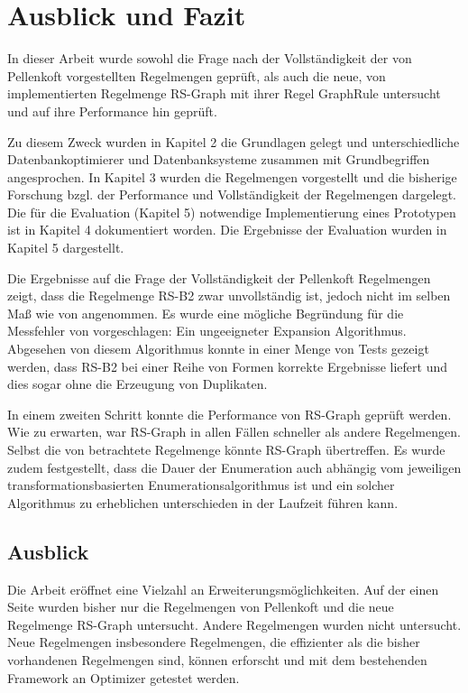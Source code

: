 \chapter{Ausblick und Fazit}


In dieser Arbeit wurde sowohl die Frage nach der Vollständigkeit der von Pellenkoft vorgestellten Regelmengen geprüft, als auch die neue, von \cite{shanbhag2014optimizing} implementierten Regelmenge RS-Graph mit ihrer Regel GraphRule untersucht und auf ihre Performance hin geprüft.

Zu diesem Zweck wurden in Kapitel 2 die Grundlagen gelegt und unterschiedliche Datenbankoptimierer und Datenbanksysteme zusammen mit Grundbegriffen angesprochen. In Kapitel 3 wurden die Regelmengen vorgestellt und die bisherige Forschung bzgl. der Performance und Vollständigkeit der Regelmengen dargelegt. Die für die Evaluation (Kapitel 5) notwendige Implementierung eines Prototypen ist in Kapitel 4 dokumentiert worden. Die Ergebnisse der Evaluation wurden in Kapitel 5 dargestellt.

Die Ergebnisse auf die Frage der Vollständigkeit der Pellenkoft Regelmengen zeigt, dass die Regelmenge RS-B2 zwar unvollständig ist, jedoch nicht im selben Maß wie von \cite{shanbhag2014optimizing} angenommen. Es wurde eine mögliche Begründung für die Messfehler von \cite{shanbhag2014optimizing} vorgeschlagen: Ein ungeeigneter Expansion Algorithmus. Abgesehen von diesem Algorithmus konnte in einer Menge von Tests gezeigt werden, dass RS-B2 bei einer Reihe von Formen korrekte Ergebnisse liefert und dies sogar ohne die Erzeugung von Duplikaten.

In einem zweiten Schritt konnte die Performance von RS-Graph geprüft werden. Wie zu erwarten, war RS-Graph in allen Fällen schneller als andere Regelmengen. Selbst die von \cite{shanbhag2014optimizing} betrachtete Regelmenge könnte RS-Graph übertreffen. Es wurde zudem festgestellt, dass die Dauer der Enumeration auch abhängig vom jeweiligen transformationsbasierten Enumerationsalgorithmus ist und ein solcher Algorithmus zu erheblichen unterschieden in der Laufzeit führen kann.

\section{Ausblick}

Die Arbeit eröffnet eine Vielzahl an Erweiterungsmöglichkeiten. Auf der einen Seite wurden bisher nur die Regelmengen von Pellenkoft und die neue Regelmenge RS-Graph untersucht. Andere Regelmengen wurden nicht untersucht. Neue Regelmengen insbesondere Regelmengen, die effizienter als die bisher vorhandenen Regelmengen sind, können erforscht und mit dem bestehenden Framework an Optimizer getestet werden.

